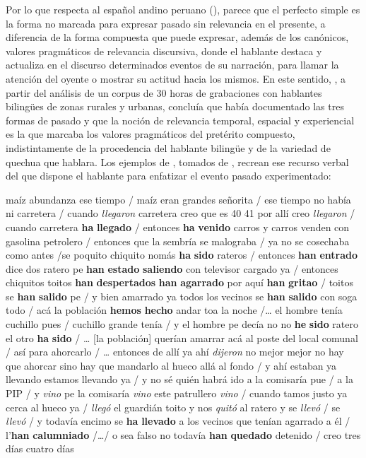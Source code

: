 \documentclass[output=paper]{../langscibook}
\begin{document}
Por lo que respecta al español andino peruano (\citealt{Escobar1997,Escobar2000,Godenzzi1986,GarcíaTesoro2015,GarcíaTesoro2017,GarcíaTesoro2018,Howe2018,PalaciosAlcaineEtAl2018}), parece que el perfecto simple es la forma no marcada para expresar pasado sin relevancia en el presente, a diferencia de la forma compuesta que puede expresar, además de los canónicos, valores pragmáticos de relevancia discursiva, donde el hablante destaca y actualiza en el discurso determinados eventos de su narración, para llamar la atención del oyente o mostrar su actitud hacia los mismos. En este sentido, \citet{Escobar2000}, a partir del análisis de un corpus de 30 horas de grabaciones con hablantes bilingües de zonas rurales y urbanas, concluía que había documentado las tres formas de pasado y que la noción de relevancia temporal, espacial y experiencial es la que marcaba los valores pragmáticos del pretérito compuesto, indistintamente de la procedencia del hablante bilingüe y de la variedad de quechua que hablara. Los ejemplos de , tomados de \citet[242––245]{Escobar2000}, recrean ese recurso verbal del que dispone el hablante para enfatizar el evento pasado experimentado:

\ea\label{ex:palacios:6}
\ea maíz abundanza ese tiempo / maíz eran grandes señorita / ese tiempo no había ni carretera / cuando \textit{llegaron} carretera creo que es 40 41 por allí creo \textit{llegaron} / cuando carretera \textbf{ha} \textbf{llegado} / entonces \textbf{ha} \textbf{venido} carros y carros venden con gasolina petrolero / entonces que la sembría se malograba / ya no se cosechaba como antes /se poquito chiquito nomás
\ex \textbf{ha} \textbf{sido} rateros / entonces \textbf{han} \textbf{entrado} dice dos ratero pe \textbf{han} \textbf{estado} \textbf{saliendo} con televisor cargado ya / entonces chiquitos toitos \textbf{han} \textbf{despertados} \textbf{han} \textbf{agarrado} por aquí \textbf{han} \textbf{gritao} / toitos se \textbf{han} \textbf{salido} pe / y bien amarrado ya todos los vecinos se \textbf{han} \textbf{salido} con soga todo / acá la población \textbf{hemos} \textbf{hecho} andar toa la noche /… el hombre tenía cuchillo pues / cuchillo grande tenía / y el hombre pe decía no no \textbf{he} \textbf{sido} ratero el otro \textbf{ha} \textbf{sido} / … [la población] querían amarrar acá al poste del local comunal / así para ahorcarlo / … entonces de allí ya ahí \textit{dijeron} no mejor mejor no hay que ahorcar sino hay que mandarlo al hueco allá al fondo / y ahí estaban ya llevando estamos llevando ya / y no sé quién habrá ido a la comisaría pue / a la PIP / y \textit{vino} pe la comisaría \textit{vino} este patrullero \textit{vino} / cuando tamos justo ya cerca al hueco ya / \textit{llegó} el guardián toito y nos \textit{quitó} al ratero y se \textit{llevó} / se \textit{llevó}  / y todavía encimo se \textbf{ha} \textbf{llevado} a los vecinos que tenían agarrado a él / l’\textbf{han} \textbf{calumniado} /…/ o sea falso no todavía \textbf{han} \textbf{quedado} detenido / creo tres días cuatro días
\z
\z
\end{document}
